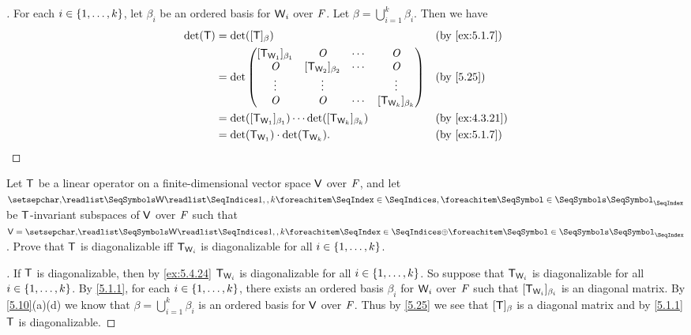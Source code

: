 \begin{proof}[]
  For each \(i \in \left\lbrace1, \dots, k\right\rbrace\), let \(\beta_i\) be an ordered basis for \(\mathsf{W}_i\) over \(\mathit{F}\).
  Let \(\beta = \bigcup_{i = 1}^k \beta_i\).
  Then we have
  \begin{align*}
    \det(\T) & = \det([\T]_{\beta})                                                                            &  & \text{(by \cref{ex:5.1.7})}  \\
             & = \det\begin{pmatrix}
                       [\T_{\W_1}]_{\beta_1} & \zm                   & \cdots & \zm                   \\
                       \zm                   & [\T_{\W_2}]_{\beta_2} & \cdots & \zm                   \\
                       \vdots                & \vdots                &        & \vdots                \\
                       \zm                   & \zm                   & \cdots & [\T_{\W_k}]_{\beta_k}
                     \end{pmatrix} &  & \text{(by \cref{5.25})}                                \\
             & = \det([\T_{\W_1}]_{\beta_1}) \cdots \det([\T_{\W_k}]_{\beta_k})                                &  & \text{(by \cref{ex:4.3.21})} \\
             & = \det(\T_{\W_1}) \cdot \det(\T_{\W_k}).                                                        &  & \text{(by \cref{ex:5.1.7})}
  \end{align*}
\end{proof}

\begin{ex}\label{ex:5.4.38}
  Let \(\mathsf{T}\) be a linear operator on a finite-dimensional vector space \(\mathsf{V}\) over \(\mathit{F}\), and let \(\seq{\W}{1,,k}\) be \(\mathsf{T}\)-invariant subspaces of \(\mathsf{V}\) over \(\mathit{F}\) such that \(\V = \seq[\oplus]{\W}{1,,k}\).
  Prove that \(\mathsf{T}\) is diagonalizable iff \(\mathsf{T}_{\mathsf{W}_i}\) is diagonalizable for all \(i \in \left\lbrace1, \dots, k\right\rbrace\).
\end{ex}

\begin{proof}[]
  If \(\mathsf{T}\) is diagonalizable, then by \cref{ex:5.4.24} \(\mathsf{T}_{\mathsf{W}_i}\) is diagonalizable for all \(i \in \left\lbrace1, \dots, k\right\rbrace\).
  So suppose that \(\mathsf{T}_{\mathsf{W}_i}\) is diagonalizable for all \(i \in \left\lbrace1, \dots, k\right\rbrace\).
  By \cref{5.1.1}, for each \(i \in \left\lbrace1, \dots, k\right\rbrace\), there exists an ordered basis \(\beta_i\) for \(\mathsf{W}_i\) over \(\mathit{F}\) such that \([\mathsf{T}_{\mathsf{W}_i}]_{\beta_i}\) is an diagonal matrix.
  By \cref{5.10}(a)(d) we know that \(\beta = \bigcup_{i = 1}^k \beta_i\) is an ordered basis for \(\mathsf{V}\) over \(\mathit{F}\).
  Thus by \cref{5.25} we see that \([\mathsf{T}]_{\beta}\) is a diagonal matrix and by \cref{5.1.1} \(\mathsf{T}\) is diagonalizable.
\end{proof}

